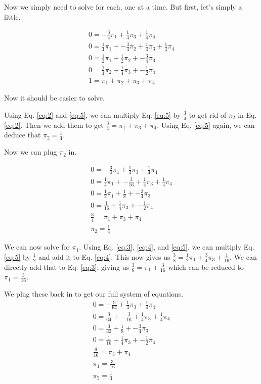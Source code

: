 \documentclass[12pt]{article}
\begin{document}
Now we simply need to solve for each, one at a time.
But first, let's simply a little.

\begin{gather}
  0 = -\frac{3}{4}\pi_1 + \frac{1}{4}\pi_3 + \frac{1}{4}\pi_4 \label{eq:1} \\
  0 = \frac{1}{4}\pi_1 + -\frac{3}{4}\pi_2 + \frac{1}{4}\pi_3 + \frac{1}{4}\pi_4 \label{eq:2} \\
  0 = \frac{1}{2}\pi_1 + \frac{1}{2}\pi_2 + -\frac{3}{4}\pi_3 \label{eq:3} \\
  0 = \frac{1}{4}\pi_2 + \frac{1}{4}\pi_3 + -\frac{1}{2}\pi_4 \label{eq:4} \\
  1 = \pi_1 + \pi_2 + \pi_3 + \pi_4 \label{eq:5}
\end{gather}

Now it should be easier to solve.

Using Eq. \ref{eq:2} and \ref{eq:5}, we can multiply Eq. \ref{eq:5} by $\frac{3}{4}$ to get rid of $\pi_2$ in Eq. \ref{eq:2}. Then we add them to get $\frac{3}{4} = \pi_1 + \pi_3 + \pi_4$. Using Eq. \ref{eq:5} again, we can deduce that $\pi_2 = \frac{1}{4}$.

Now we can plug $\pi_2$ in.

\begin{gather*}
  0 = -\frac{3}{4}\pi_1 + \frac{1}{4}\pi_3 + \frac{1}{4}\pi_4 \\
  0 = \frac{1}{4}\pi_1 + -\frac{3}{16} + \frac{1}{4}\pi_3 + \frac{1}{4}\pi_4 \\
  0 = \frac{1}{2}\pi_1 + \frac{1}{8} + -\frac{3}{4}\pi_3 \\
  0 = \frac{1}{16} + \frac{1}{4}\pi_3 + -\frac{1}{2}\pi_4 \\
  \frac{3}{4} = \pi_1 + \pi_3 + \pi_4 \\
  \pi_2 = \frac{1}{4}
\end{gather*}

We can now solve for $\pi_1$. Using Eq. \ref{eq:3}, \ref{eq:4}, and \ref{eq:5}, we can multiply Eq. \ref{eq:5} by $\frac{1}{2}$ and add it to Eq. \ref{eq:4}. This now gives us $\frac{3}{8} = \frac{1}{2}\pi_1 + \frac{3}{4}\pi_3 + \frac{1}{16}$. We can directly add that to Eq. \ref{eq:3}, giving us $\frac{3}{8} = \pi_1 + \frac{3}{16}$ which can be reduced to $\pi_1 = \frac{3}{16}$.

We plug these back in to get our full system of equations.
\begin{gather*}
  0 = -\frac{9}{64} + \frac{1}{4}\pi_3 + \frac{1}{4}\pi_4 \\
  0 = \frac{3}{64} + -\frac{3}{16} + \frac{1}{4}\pi_3 + \frac{1}{4}\pi_4 \\
  0 = \frac{3}{32} + \frac{1}{8} + -\frac{3}{4}\pi_3 \\
  0 = \frac{1}{16} + \frac{1}{4}\pi_3 + -\frac{1}{2}\pi_4 \\
  \frac{9}{16} = \pi_3 + \pi_4 \\
  \pi_1 = \frac{3}{16} \\
  \pi_2 = \frac{1}{4}
\end{gather*}
\end{document}
